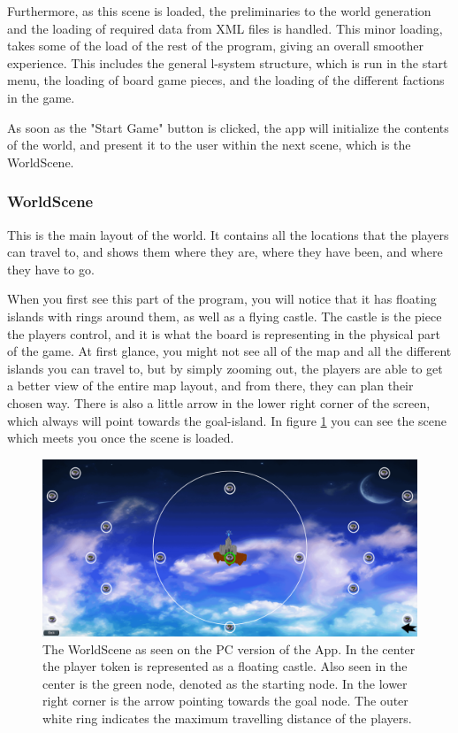 Furthermore, as this scene is loaded, the preliminaries to the world generation and the loading of required data from XML files is handled. This minor loading, takes some of the load of the rest of the program, giving an overall smoother experience.
This includes the general l-system structure, which is run in the start menu, the loading of board game pieces, and the loading of the different factions in the game.

As soon as the "Start Game" button is clicked, the app will initialize the contents of the world, and present it to the user within the next scene, which is the WorldScene.

\subsubsection{WorldScene}
\label{sec:worldscene}
This is the main layout of the world. It contains all the locations that the players can travel to, and shows them where they are, where they have been, and where they have to go.

When you first see this part of the program, you will notice that it has floating islands with rings around them, as well as a flying castle. The castle is the piece the players control, and it is what the board is representing in the physical part of the game.
At first glance, you might not see all of the map and all the different islands you can travel to, but by simply zooming out, the players are able to get a better view of the entire map layout, and from there, they can plan their chosen way. There is also a little arrow in the lower right corner of the screen, which always will point towards the goal-island. 
In figure \ref{fig:worldSc} you can see the scene which meets you once the scene is loaded.

\begin{figure}[h]
    \centering
    \includegraphics[scale=0.3]{Images/WorldScene.png}
    \caption{The WorldScene as seen on the PC version of the App. In the center the player token is represented as a floating castle. Also seen in the center is the green node, denoted as the starting node. In the lower right corner is the arrow pointing towards the goal node. The outer white ring indicates the maximum travelling distance of the players.}
    \label{fig:worldSc}
\end{figure}

